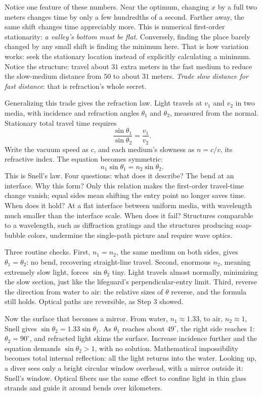 \begin{mainline}
Notice one feature of these numbers. Near the optimum, changing \(x\) by a full two meters changes time by only a few hundredths of a second. Farther away, the same shift changes time appreciably more. This is numerical first-order stationarity: \emph{a valley's bottom must be flat}. Conversely, finding the place barely changed by any small shift is finding the minimum here. That is how variation works: seek the stationary location instead of explicitly calculating a minimum. Notice the structure: travel about \(31\) extra meters in the fast medium to reduce the slow-medium distance from \(50\) to about \(31\) meters. \emph{Trade slow distance for fast distance}: that is refraction's whole secret.

Generalizing this trade gives the refraction law. Light travels at \(v_1\) and \(v_2\) in two media, with incidence and refraction angles \(\theta_1\) and \(\theta_2\), measured from the normal. Stationary total travel time requires
\[
  \frac{\sin\theta_1}{\sin\theta_2}=\frac{v_1}{v_2}.
\]
Write the vacuum speed as \(c\), and each medium's slowness as \(n=c/v\), its refractive index. The equation becomes symmetric:
\[
  n_1\sin\theta_1=n_2\sin\theta_2.
\]
This is Snell's law. Four questions: what does it describe? The bend at an interface. Why this form? Only this relation makes the first-order travel-time change vanish; equal sides mean shifting the entry point no longer saves time. When does it hold? At a flat interface between uniform media, with wavelength much smaller than the interface scale. When does it fail? Structures comparable to a wavelength, such as diffraction gratings and the structures producing soap-bubble colors, undermine the single-path picture and require wave optics.

Three routine checks. First, \(n_1=n_2\), the same medium on both sides, gives \(\theta_1=\theta_2\): no bend, recovering straight-line travel. Second, enormous \(n_2\), meaning extremely slow light, forces \(\sin\theta_2\) tiny. Light travels almost normally, minimizing the slow section, just like the lifeguard's perpendicular-entry limit. Third, reverse the direction from water to air: the relative sizes of \(\theta\) reverse, and the formula still holds. Optical paths are reversible, as Step 3 showed.
\end{mainline}

Now the surface that becomes a mirror. From water, \(n_1\approx1.33\), to air, \(n_2\approx1\), Snell gives \(\sin\theta_2=1.33\sin\theta_1\). As \(\theta_1\) reaches about \(49^{\circ}\), the right side reaches \(1\): \(\theta_2=90^{\circ}\), and refracted light skims the surface. Increase incidence further and the equation demands \(\sin\theta_2>1\), with no solution. Mathematical impossibility becomes total internal reflection: all the light returns into the water. Looking up, a diver sees only a bright circular window overhead, with a mirror outside it: Snell's window. Optical fibers use the same effect to confine light in thin glass strands and guide it around bends over kilometers.

